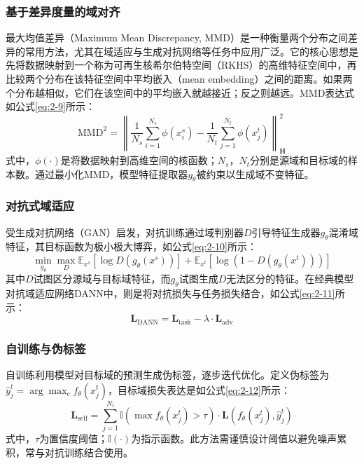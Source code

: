 \subsubsection{基于差异度量的域对齐}
最大均值差异（Maximum Mean Discrepancy, MMD）是一种衡量两个分布之间差异的常用方法，尤其在域适应与生成对抗网络等任务中应用广泛。它的核心思想是先将数据映射到一个称为可再生核希尔伯特空间（RKHS）的高维特征空间中，再比较两个分布在该特征空间中平均嵌入（mean embedding）之间的距离。如果两个分布越相似，它们在该空间中的平均嵌入就越接近；反之则越远。MMD表达式如公式\eqref{eq:2-9}所示：
\begin{equation}
    \label{eq:2-9}
    \text{MMD}^2 = \left\| \frac{1}{N_s} \sum_{i=1}^{N_s} \phi(x_i^s) - \frac{1}{N_t} \sum_{j=1}^{N_t} \phi(x_j^t) \right\|_{\mathbf{H}}^2
\end{equation}
式中，$\phi(\cdot)$是将数据映射到高维空间的核函数；$N_s$，$N_t$分别是源域和目标域的样本数。通过最小化MMD，模型特征提取器$g_\theta$被约束以生成域不变特征。%
\subsubsection{对抗式域适应}
受生成对抗网络（GAN）启发，对抗训练通过域判别器$D$引导特征生成器$g_\theta$混淆域特征，其目标函数为极小极大博弈，如公式\eqref{eq:2-10}所示：
\begin{equation}
    \label{eq:2-10}
    \min_{g_\theta} \max_{D} \mathbb{E}_{x^s}[\log D(g_\theta(x^s))] + \mathbb{E}_{x^t}[\log (1 - D(g_\theta(x^t)))]
\end{equation}
其中$D$试图区分源域与目标域特征，而$g_\theta$试图生成$D$无法区分的特征。在经典模型对抗域适应网络DANN中，则是将对抗损失与任务损失结合，如公式\eqref{eq:2-11}所示：
\begin{equation}
    \label{eq:2-11}
    \mathbf{L}_{\text{DANN}} = \mathbf{L}_{\text{task}} - \lambda \cdot \mathbf{L}_{\text{adv}}
\end{equation}

\subsubsection{自训练与伪标签}
自训练利用模型对目标域的预测生成伪标签，逐步迭代优化。定义伪标签为$\hat{y}_j^t = \arg\max_c f_\theta(x_j^t)$，目标域损失表达是如公式\eqref{eq:2-12}所示：
\begin{equation}
    \label{eq:2-12}
    \mathbf{L}_{\text{self}} = \sum_{j=1}^{N_t} \mathbb{I}(\max f_\theta(x_j^t) > \tau) \cdot \mathbf{L}(f_\theta(x_j^t), \hat{y}_j^t)
\end{equation}
式中，$\tau$为置信度阈值；$\mathbb{I}(\cdot)$为指示函数。此方法需谨慎设计阈值以避免噪声累积，常与对抗训练结合使用。

